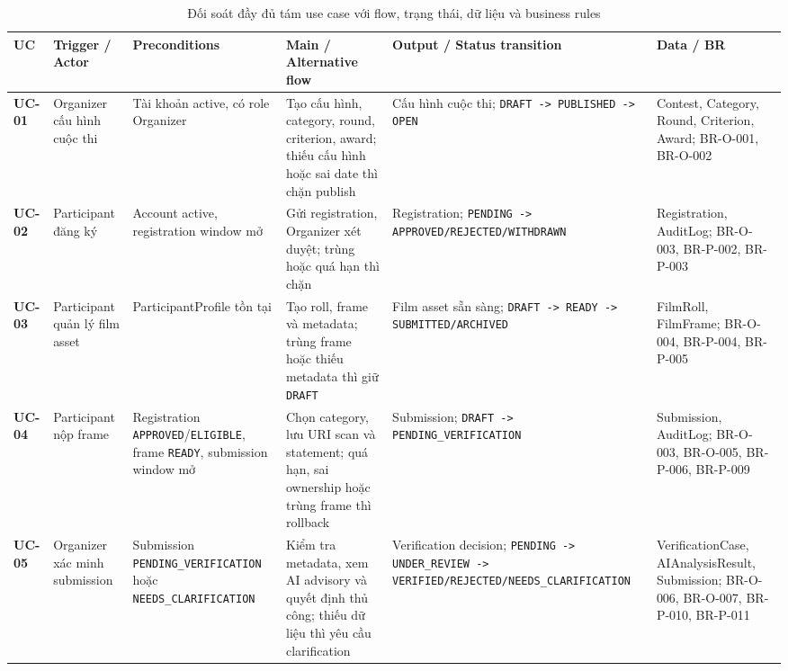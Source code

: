 \begin{table}[!ht]
\centering
\caption{Đối soát đầy đủ tám use case với flow, trạng thái, dữ liệu và business rules}
\label{tab:c2_uc_baseline}
\tiny
\begin{tabularx}{\textwidth}{p{0.8cm}>{\raggedright\arraybackslash}p{1.6cm}>{\raggedright\arraybackslash}p{2.2cm}>{\raggedright\arraybackslash}p{2.8cm}>{\raggedright\arraybackslash}X>{\raggedright\arraybackslash}p{2.6cm}}
\toprule
\textbf{UC} & \textbf{Trigger / Actor} & \textbf{Preconditions} & \textbf{Main / Alternative flow} & \textbf{Output / Status transition} & \textbf{Data / BR} \\
\midrule
\textbf{UC-01} & Organizer cấu hình cuộc thi & Tài khoản active, có role Organizer & Tạo cấu hình, category, round, criterion, award; thiếu cấu hình hoặc sai date thì chặn publish & Cấu hình cuộc thi; \texttt{DRAFT -> PUBLISHED -> OPEN} & Contest, Category, Round, Criterion, Award; BR-O-001, BR-O-002 \\
\textbf{UC-02} & Participant đăng ký & Account active, registration window mở & Gửi registration, Organizer xét duyệt; trùng hoặc quá hạn thì chặn & Registration; \texttt{PENDING -> APPROVED/\allowbreak REJECTED/\allowbreak WITHDRAWN} & Registration, AuditLog; BR-O-003, BR-P-002, BR-P-003 \\
\textbf{UC-03} & Participant quản lý film asset & Participant\allowbreak Profile tồn tại & Tạo roll, frame và metadata; trùng frame hoặc thiếu metadata thì giữ \texttt{DRAFT} & Film asset sẵn sàng; \texttt{DRAFT -> READY -> SUBMITTED/\allowbreak ARCHIVED} & FilmRoll, FilmFrame; BR-O-004, BR-P-004, BR-P-005 \\
\textbf{UC-04} & Participant nộp frame & Registration \texttt{APPROVED}/\allowbreak\texttt{ELIGIBLE}, frame \texttt{READY}, submission window mở & Chọn category, lưu URI scan và statement; quá hạn, sai ownership hoặc trùng frame thì rollback & Submission; \texttt{DRAFT -> PENDING\_\allowbreak VERIFICATION} & Submission, AuditLog; BR-O-003, BR-O-005, BR-P-006, BR-P-009 \\
\textbf{UC-05} & Organizer xác minh submission & Submission \texttt{PENDING\_\allowbreak VERIFICATION} hoặc \texttt{NEEDS\_\allowbreak CLARIFICATION} & Kiểm tra metadata, xem AI advisory và quyết định thủ công; thiếu dữ liệu thì yêu cầu clarification & Verification decision; \texttt{PENDING -> UNDER\_\allowbreak REVIEW -> VERIFIED/\allowbreak REJECTED/\allowbreak NEEDS\_\allowbreak CLARIFICATION} & Verification\allowbreak Case, AIAnalysis\allowbreak Result, Submission; BR-O-006, BR-O-007, BR-P-010, BR-P-011 \\

\end{tabularx}
\end{table}
